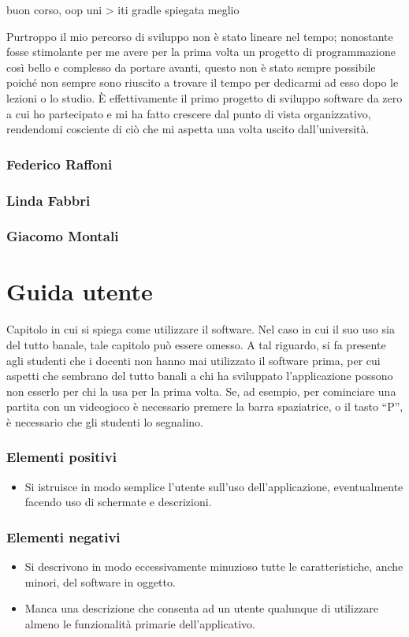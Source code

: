 \documentclass[a4paper,12pt]{report}
\begin{document}
buon corso, oop uni > iti
gradle spiegata meglio

Purtroppo il mio percorso di sviluppo non è stato lineare nel tempo; nonostante fosse stimolante per me avere per la prima volta un progetto di programmazione così bello e complesso da portare avanti, questo non è stato sempre possibile poiché non sempre sono riuscito a trovare il tempo per dedicarmi ad esso dopo le lezioni o lo studio. È effettivamente il primo progetto di sviluppo software da zero a cui ho partecipato e mi ha fatto crescere dal punto di vista organizzativo, rendendomi cosciente di ciò che mi aspetta una volta uscito dall'università.
\subsection{Federico Raffoni}
\subsection{Linda Fabbri}
\subsection{Giacomo Montali}
\appendix
\chapter{Guida utente}

Capitolo in cui si spiega come utilizzare il software. Nel caso in cui il suo uso sia del tutto
banale, tale capitolo può essere omesso.
%
A tal riguardo, si fa presente agli studenti che i docenti non hanno mai utilizzato il software
prima, per cui aspetti che sembrano del tutto banali a chi ha sviluppato l'applicazione possono non
esserlo per chi la usa per la prima volta.
%
Se, ad esempio, per cominciare una partita con un videogioco è necessario premere la barra
spaziatrice, o il tasto ``P'', è necessario che gli studenti lo segnalino.

\subsection*{Elementi positivi}

\begin{itemize}
 \item Si istruisce in modo semplice l'utente sull'uso dell'applicazione, eventualmente facendo uso di schermate e descrizioni.
\end{itemize}

\subsection*{Elementi negativi}
\begin{itemize}
 \item Si descrivono in modo eccessivamente minuzioso tutte le caratteristiche, anche minori, del software in oggetto.
 \item Manca una descrizione che consenta ad un utente qualunque di utilizzare almeno le funzionalità primarie dell'applicativo.
\end{itemize}
\end{document}
